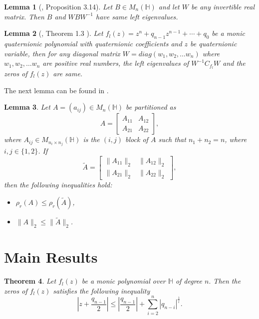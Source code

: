 \documentclass [12pt]{article}
\newtheorem{theorem}{Theorem}
[section]
\newtheorem{lemma}[theorem]{Lemma}
\begin{document}
\begin{lemma}[\cite{ASS2}, Proposition 3.14]{\label{lemma 3.3}}
	Let $B \in M_{n}{(\mathbb{H})}$ and let $W$ be any invertible real matrix. Then $B$ and $WBW^{-1}$ have same left eigenvalues. 
\end{lemma}
\begin{lemma}[\cite{DR}, Theorem 1.3 ]{\label{lemma 3.4}} Let  $f_l(z) = z^n + q_{n-1} z^{n-1} + \cdots + q_0$ be a monic 
	quaternionic polynomial with quaternionic coefficients  and $z$ be quaternionic variable,  then for any diagonal matrix $W= diag(w_{1},w_{2},\dots w_{n})$ where  $w_{1},w_{2},\dots w_{n}$ are positive real numbers, the left eigenvalues of $W^{-1}C_{f_{l}}W$  and the zeros of  $f_{l}(z)$  are same.
\end{lemma}
\noindent The next lemma can be found in \cite{INT}.
\begin{lemma}{\label{lemma 3.5}}
	Let \( A = (a_{ij}) \in M_n(\mathbb{H}) \) be partitioned as
	\[
	A = \begin{bmatrix}
		A_{11} & A_{12} \\
		A_{21} & A_{22}
	\end{bmatrix},
	\]
	where \( A_{ij} \in M_{n_i \times n_j}(\mathbb{H}) \) is the \((i,j)\) block of \( A \) such that \( n_1 + n_2 = n \), where \( i,j \in \{1,2\} \). If
	\[
	\tilde{A} = \begin{bmatrix}
		\|A_{11}\|_2 & \|A_{12}\|_2 \\
		\|A_{21}\|_2 & \|A_{22}\|_2
	\end{bmatrix},
	\]
	then the following inequalities hold:
	\begin{itemize}
		\item \( \rho_r(A) \leq \rho_r(\tilde{A}) \),
		\item \( \|A\|_2 \leq \|\tilde{A}\|_2 \).
	\end{itemize}
\end{lemma}



\section{Main Results}
\begin{theorem}\label{th:01}
	Let $f_{l}(z)$ be a  monic polynomial over $\mathbb{H}$ of degree $n.$ Then the zeros of $f_{l}(z)$ satisfies the following inequality
	\begin{equation}
		\left|z+\dfrac{q_{n-1}}{2}\right|\le \left|\dfrac{q_{n-1}}{2}\right|+\sum\limits_{i=2}^{n}|q_{n-i}|^{\frac{1}{i}}.\label{eq:01}
	\end{equation}
\end{theorem}
\end{document}
